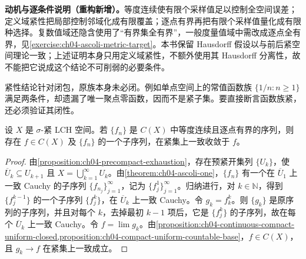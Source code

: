 \documentclass[../../main.tex]{subfiles}%
\begin{document}
\begin{remark}
\textbf{动机与逐条件说明（重构新增）。}等度连续使有限个采样值足以控制全空间误差；定义域紧性把局部控制邻域化成有限覆盖；逐点有界再把有限个采样值量化成有限种选择。复数值域还隐含使用了“有界集全有界”，一般度量值域中需改成逐点全有界，见\cref{exercise:ch04-ascoli-metric-target}。本书保留 Hausdorff 假设以与前后紧空间理论一致；上述证明本身只用定义域紧性，不额外使用其 Hausdorff 分离性，故不能把它说成这个结论不可削弱的必要条件。

紧性结论针对闭包，原族本身未必闭。例如单点空间上的常值函数族 $\{1/n:n\ge1\}$ 满足两条件，却遗漏了唯一聚点零函数，因而不是紧子集。要直接断言函数族紧，还必须验证其闭性。
\end{remark}
\begin{theorem}\label{theorem:ch04-ascoli-two}
设 $X$ 是 $\sigma$-紧 LCH 空间。若 $\{f_n\}$ 是 $C(X)$ 中等度连续且逐点有界的序列，则存在 $f\in C(X)$ 及 $\{f_n\}$ 的一个子序列，在紧集上一致收敛于 $f$。
\end{theorem}
\begin{proof}
由\cref{proposition:ch04-precompact-exhaustion}，存在预紧开集列 $\{U_k\}$，使 $\overline U_k\subseteq U_{k+1}$ 且 $X=\bigcup_{k=1}^{\infty}U_k$。由\cref{theorem:ch04-ascoli-one}，$\{f_n\}$ 有一个在 $\overline U_1$ 上一致 Cauchy 的子序列 $\{f_{n_j}\}_{j=1}^{\infty}$，记为 $\{f_j^1\}_{j=1}^{\infty}$。归纳进行，对 $k\in\mathbb N$，得到 $\{f_j^{k-1}\}$ 的一个子序列 $\{f_j^k\}$，在 $\overline U_k$ 上一致 Cauchy。令 $g_k=f_k^k$。则 $\{g_k\}$ 是原序列的子序列，并且对每个 $k$，去掉最初 $k-1$ 项后，它是 $\{f_j^k\}$ 的子序列，故在每个 $\overline U_k$ 上一致 Cauchy。令 $f=\lim g_k$。由\cref{proposition:ch04-continuous-compact-uniform-closed,proposition:ch04-compact-uniform-countable-base}，$f\in C(X)$，且 $g_k\to f$ 在紧集上一致成立。
\end{proof}
\end{document}
